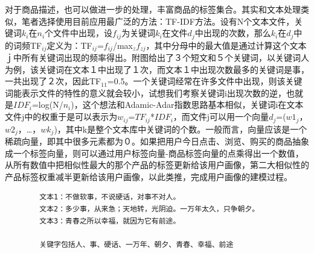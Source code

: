 		对于商品描述，也可以做进一步的处理，丰富商品的标签集合。其实和文本处理类似，笔者选择使用目前应用最广泛的方法：TF-IDF方法。设有N个文本文件，关键词$k_{i}$在$n_{i}$个文件中出现，设$f_{ij}$为关键词$k_i$在文件$d_j$中出现的次数，那么$k_i$在$d_j$中的词频TF$_{ij}$定义为：TF$_{ij}$=$f_{ij}$/max$_zf_{zj}$，其中分母中的最大值是通过计算这个文本ｊ中所有关键词出现的频率得出。附图给出了３个短文和５个关键词，以关键词人为例，该关键词在文本１中出现了１次，而文本１中出现次数最多的关键词是事，一共出现了２次，因此TF$_{11}$=0.5。一个关键词经常在许多文件中出现，则该关键词能表示文件的特性的意义就会较小，试想我们考察关键词i出现次数的逆，也就是$IDF_{i}$=log(N/$n_{i}$)，这个想法和Adamic-Adar指数思路基本相似，关键词i在文本文件j中的权重于是可以表示为$w_{ij}$=$TF_{ij}$*$IDF_{i}$，而文件j可以用一个向量$d_{j}$=($w1_{j}$，$w2_{j}$，…，$wk_{j}$)，其中k是整个文本库中关键词的个数。一般而言，向量应该是一个稀疏向量，即其中很多元素都为０。如果把用户今日点击、浏览、购买的商品抽象成一个标签向量，则可以通过用户标签向量-商品标签向量的点乘得出一个数值，从所有数值中把相似性最大的那个产品的标签更新给该用户画像，第二大相似性的产品标签权重减半更新给该用户画像，以此类推，完成用户画像的建模过程。
		\begin{lstlisting}
		文本1：不做软事，不说硬话，对事不对人。
		文本2：多少事，从来急；天地转，光阴迫。一万年太久，只争朝夕。
		文本3：青春之所以幸福，就因为它有前途。

		关键字包括人、事、硬话、一万年、朝夕、青春、幸福、前途
		\end{lstlisting}

